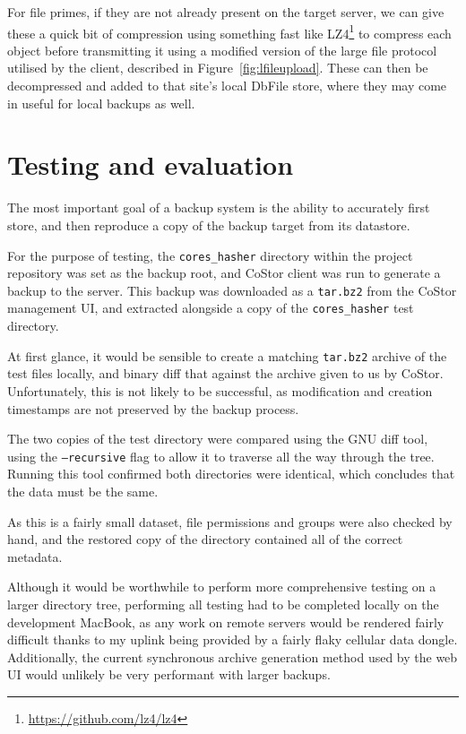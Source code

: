 \documentclass[bsc,frontabs,twoside,singlespacing,parskip,deptreport]{infthesis}     %
\begin{document}
For file primes, if they are not already present on the target server, we can give these a quick bit
of compression using something fast like LZ4\footnote{\url{https://github.com/lz4/lz4}} to compress
each object before transmitting it using a modified version of the large file protocol utilised by
the client, described in Figure~\ref{fig:lfileupload}. These can then be decompressed and added to that
site's local DbFile store, where they may come in useful for local backups as well.

\chapter{Testing and evaluation}

The most important goal of a backup system is the ability to accurately first store, and then reproduce
a copy of the backup target from its datastore.

For the purpose of testing, the \texttt{cores\_hasher} directory within the project repository was set
as the backup root, and CoStor client was run to generate a backup to the server. This backup was 
downloaded as a \texttt{tar.bz2} from the CoStor management UI, and extracted alongside a copy of
the \texttt{cores\_hasher} test directory.

At first glance, it would be sensible to create a matching \texttt{tar.bz2} archive of the test files
locally, and binary diff that against the archive given to us by CoStor. Unfortunately, this is not
likely to be successful, as modification and creation timestamps are not preserved by the backup 
process.

The two copies of the test directory were compared using the GNU diff tool, using the \texttt{--recursive}
flag to allow it to traverse all the way through the tree. Running this tool confirmed both
directories were identical, which concludes that the data must be the same.

As this is a fairly small dataset, file permissions and groups were also checked by hand, and
the restored copy of the directory contained all of the correct metadata.

Although it would be worthwhile to perform more comprehensive testing on a larger directory tree,
performing all testing had to be completed locally on the development MacBook, as any work on
remote servers would be rendered fairly difficult thanks to my uplink being provided by a fairly flaky
cellular data dongle. Additionally, the current synchronous archive generation method used by the web
UI would unlikely be very performant with larger backups.
\end{document}
